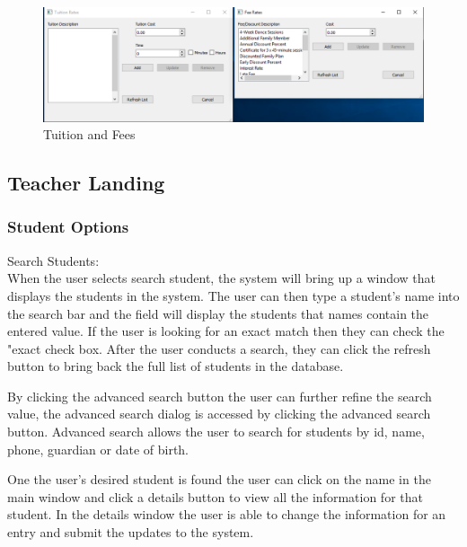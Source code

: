\begin{figure}
  \includegraphics[width=\linewidth]{pics/userGuide/tuitAndFees.png}
  \caption{Tuition and Fees} 
  \label{fig:User doc: Tuition and Fees}
\end{figure}


\subsection{Teacher Landing}

\subsubsection{Student Options}

Search Students:\\
When the user selects search student, the system will bring up a window that displays the students in the system. The user can then type a student's name into the search bar and the field will display the students that names contain the entered value. If the user is looking for an exact match then they can check the "exact check box. After the user conducts a search, they can click the refresh button to bring back the full list of students in the database.

By clicking the advanced search button the user can further refine the search value, the advanced search dialog is accessed by clicking the advanced search button. Advanced search allows the user to search for students by id, name, phone, guardian or date of birth.

One the user's desired student is found the user can click on the name in the main window and click a details button to view all the information for that student.  In the details window the user is able to change the information for an entry and submit the updates to the system.\\

